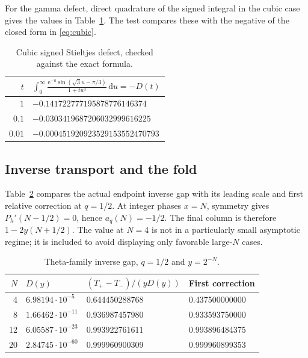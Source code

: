 \documentclass[11pt,a4paper]{article}
\numberwithin{equation}{section}
\theoremstyle{definition}
\theoremstyle{remark}
\newcommand{\dd}{\,\mathrm d}
\newcommand{\ee}{\mathrm e}
\begin{document}
For the gamma defect, direct quadrature of the signed integral in the
cubic case gives the values in Table~\ref{tab:gamma}. The test compares
these with the negative of the closed form in \eqref{eq:cubic}.

\begin{table}[htbp]
\centering
\caption{Cubic signed Stieltjes defect, checked against the exact formula.}
\label{tab:gamma}
\begin{tabular}{@{}rl@{}}
\toprule
\(t\) & \(\displaystyle\int_0^\infty
 \frac{\ee^{-u}\sin(\sqrt3u-\pi/3)}{1+tu^3}\dd u=-D(t)\)\\
\midrule
\(1\)    & \(-0.141722777195878776146374\)\\
\(0.1\)  & \(-0.0303419687206032999616225\)\\
\(0.01\) & \(-0.000451920923529153552470793\)\\
\bottomrule
\end{tabular}
\end{table}

\subsection{Inverse transport and the fold}
Table~\ref{tab:qgap} compares the actual endpoint inverse gap with its
leading scale and first relative correction at \(q=1/2\). At integer
phases \(x=N\), symmetry gives \(P_h'(N-1/2)=0\), hence
\(a_q(N)=-1/2\). The final column is therefore
\(1-2y(N+1/2)\). The value at \(N=4\) is not in a particularly small
asymptotic regime; it is included to avoid displaying only favorable
large-\(N\) cases.

\begin{table}[htbp]
\centering
\caption{Theta-family inverse gap, \(q=1/2\) and \(y=2^{-N}\).}
\label{tab:qgap}
\begin{tabular}{@{}rlll@{}}
\toprule
\(N\) & \(D(y)\) & \((T_+-T_-)/(yD(y))\) & First correction\\
\midrule
4  & \(6.98194\cdot10^{-5}\)  & 0.644450288768 & 0.437500000000\\
8  & \(1.66462\cdot10^{-11}\) & 0.936987457980 & 0.933593750000\\
12 & \(6.05587\cdot10^{-23}\) & 0.993922761611 & 0.993896484375\\
20 & \(2.84745\cdot10^{-60}\) & 0.999960900309 & 0.999960899353\\
\bottomrule
\end{tabular}
\end{table}
\end{document}

